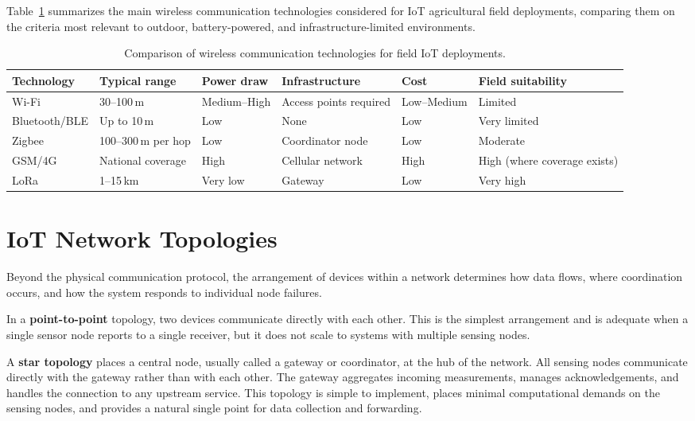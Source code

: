 Table~\ref{tab:iot-communication-comparison} summarizes the main wireless
communication technologies considered for IoT agricultural field deployments,
comparing them on the criteria most relevant to outdoor, battery-powered, and
infrastructure-limited environments.

\begin{table}[H]
  \centering
  \caption{Comparison of wireless communication technologies for field IoT deployments.}
  \label{tab:iot-communication-comparison}
  \renewcommand{\arraystretch}{1.3}
  \begin{tabular}{|p{2.2cm}|p{2.2cm}|p{2.0cm}|p{2.4cm}|p{2.0cm}|p{2.2cm}|}
    \hline
    \textbf{Technology} & \textbf{Typical range} & \textbf{Power draw} &
    \textbf{Infrastructure} & \textbf{Cost} & \textbf{Field suitability} \\
    \hline
    Wi-Fi & 30–100\,m & Medium–High & Access points required & Low–Medium & Limited \\
    \hline
    Bluetooth/BLE & Up to 10\,m & Low & None & Low & Very limited \\
    \hline
    Zigbee & 100–300\,m per hop & Low & Coordinator node & Low & Moderate \\
    \hline
    GSM/4G & National coverage & High & Cellular network & High & High (where coverage exists) \\
    \hline
    LoRa & 1–15\,km & Very low & Gateway & Low & Very high \\
    \hline
  \end{tabular}
\end{table}

\section{IoT Network Topologies}
\label{sec:topologies}

Beyond the physical communication protocol, the arrangement of devices within a
network determines how data flows, where coordination occurs, and how the system
responds to individual node failures.

In a \textbf{point-to-point} topology, two devices communicate directly with each
other. This is the simplest arrangement and is adequate when a single sensor node
reports to a single receiver, but it does not scale to systems with multiple
sensing nodes.

A \textbf{star topology} places a central node, usually called a gateway or
coordinator, at the hub of the network. All sensing nodes communicate directly
with the gateway rather than with each other. The gateway aggregates incoming
measurements, manages acknowledgements, and handles the connection to any upstream
service. This topology is simple to implement, places minimal computational
demands on the sensing nodes, and provides a natural single point for data
collection and forwarding.

